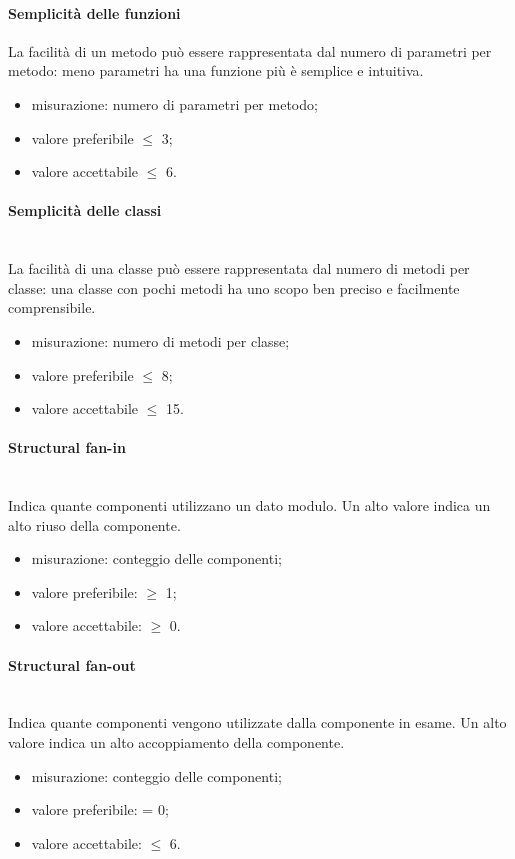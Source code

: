 			\paragraph{Semplicità delle funzioni}
			La facilità di un metodo può essere rappresentata dal numero di parametri per metodo: meno parametri ha una funzione più è semplice e intuitiva.
			\begin{itemize}
			\item misurazione: numero di parametri per metodo;
			\item valore preferibile $\leq$ 3;
			\item valore accettabile $\leq$ 6.
			\end{itemize}
			\paragraph{Semplicità delle classi}\mbox{}\\
			La facilità di una classe può essere rappresentata dal numero di metodi per classe: una classe con pochi metodi ha uno scopo ben preciso e facilmente comprensibile.
			\begin{itemize}
			\item misurazione: numero di metodi per classe;
			\item valore preferibile $\leq$ 8;
			\item valore accettabile $\leq$ 15.
			\end{itemize}
			\paragraph{Structural fan-in}\mbox{}\\ 
			Indica quante componenti utilizzano un dato modulo. Un alto	valore indica un alto riuso della componente.
			\begin{itemize}
				\item misurazione: conteggio delle componenti;
				\item valore preferibile: $\geq$ 1;
				\item valore accettabile: $\geq$ 0.
			\end{itemize}
			\paragraph{Structural fan-out}\mbox{}\\
			 Indica quante componenti vengono utilizzate dalla componente in esame. Un alto valore indica un alto accoppiamento della componente.
			\begin{itemize}
				\item misurazione: conteggio delle componenti;
				\item valore preferibile: = 0;
				\item valore accettabile: $\leq$ 6.
			\end{itemize}
